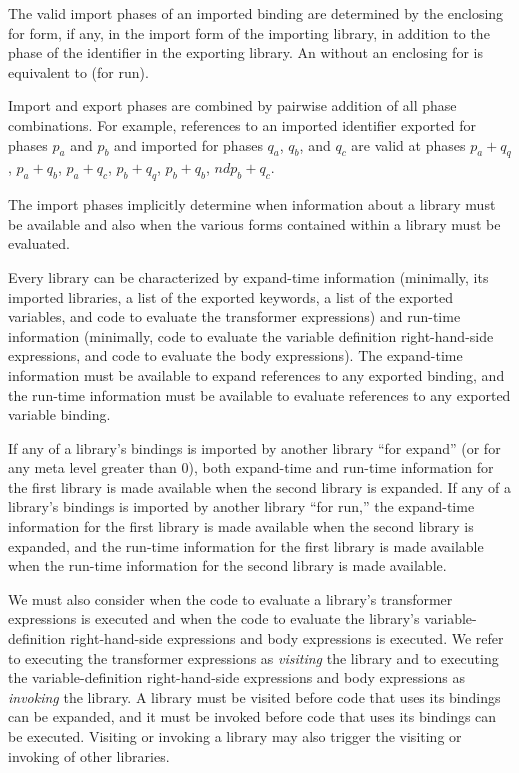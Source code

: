 The valid import phases of an imported binding are determined by the enclosing
{\cf for} form, if any, in the {\cf import} form of the importing
library, in addition to the phase of the identifier in the exporting library.
An  without an enclosing {\cf for} is equivalent to
{\cf (for  run)}.

Import and export phases are combined by pairwise addition of all phase
combinations.  For example, references to an imported identifier exported
for phases $p_a$ and $p_b$ and imported for phases $q_a$, $q_b$, and $q_c$
are valid at phases $p_a+q_q$, $p_a+q_b$, $p_a+q_c$, $p_b+q_q$, $p_b+q_b$,
$nd p_b+q_c$.

The import phases implicitly determine when information about a
library must be available and also when the various forms contained within
a library must be evaluated.

Every library can be characterized by expand-time information (minimally,
its imported libraries, a list of the exported keywords, a list of the
exported variables, and code to evaluate the transformer expressions) and
run-time information (minimally, code to evaluate the variable definition
right-hand-side expressions, and code to evaluate the body expressions).
The expand-time information must be available to expand references to
any exported binding, and the run-time information must be available to
evaluate references to any exported variable binding.

If any of a library's bindings is imported by another library ``for
{\cf expand}'' (or for any meta level greater than 0), both expand-time and
run-time information for the first library is made available when the second
library is expanded.
If any of a library's bindings is imported by another library ``for
{\cf run},'' the expand-time information for the first library is made available when
the second library is expanded, and the run-time information for the first
library is made available when the run-time information for the second library
is made available.

We must also consider when the code to evaluate a library's transformer
expressions is executed and when the code to evaluate the library's
variable-definition right-hand-side expressions and body expressions is
executed.
We refer to executing the transformer expressions as \emph{visiting}
the library and to executing the variable-definition right-hand-side 
expressions and body expressions as \emph{invoking} the library.
A library must be visited before code that uses its bindings can be
expanded, and it must be invoked before code that uses its bindings can be
executed.
Visiting or invoking a library may also trigger the visiting or
invoking of other libraries.

